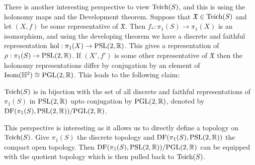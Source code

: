 There is another interesting perspective to view $\text{Teich}(S)$, and this is using the holonomy maps and the Development theorem. Suppose that $ \mathfrak{X}\in \text{Teich}(S)$ and let $(X,f)$ be some representative of $ \mathfrak{X}$. Then $f_*:\pi_1(S)\to \pi_1(X)$ is an isomorphism, and using the developing theorem we have a discrete and faithful representation $\text{hol}:\pi_1(X)\to \text{PSL}(2,\mathbb{R})$. This gives a representation of $\rho:\pi_1(S)\to \text{PSL}(2,\mathbb{R})$. If $(X',f')$ is some other representative of $ \mathfrak{X}$ then the holonomy representations differ by conjugation by an element of $\text{Isom}(\mathbb{H}^2)\cong \text{PGL}(2,\mathbb{R})$. This leads to the following claim:
\begin{proposition}
  $\text{Teich}(S)$ is in bijection with the set of all discrete and faithful representations of $\pi_1(S)$ in $\text{PSL}(2,\mathbb{R})$ upto conjugation by $\text{PGL}(2,\mathbb{R})$, denoted by $\text{DF}(\pi_1(S),\text{PSL}(2,\mathbb{R}))/\text{PGL}(2,\mathbb{R})$.
\end{proposition}
This perspective is interesting as it allows us to directly define a topology on $\text{Teich}(S)$. Give $\pi_1(S)$ the discrete topology and $\text{DF}(\pi_1(S),\text{PSL}(2,\mathbb{R}))$ the compact open topology. Then $\text{DF}(\pi_1(S), \text{PSL}(2,\mathbb{R}))/\text{PGL}(2,\mathbb{R})$ can be equipped with the quotient topology which is then pulled back to $\text{Teich}(S)$.\\

